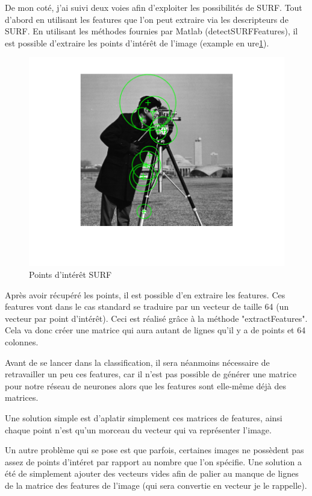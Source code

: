 De mon coté, j'ai suivi deux voies afin d'exploiter les possibilités de SURF. Tout d'abord en utilisant les features que l'on peut extraire via les descripteurs de SURF. En utilisant les méthodes fournies par Matlab (detectSURFFeatures), il est possible d'extraire les points d'intérêt de l'image (example en ure\ref{fig:surffeaturesexample}).

\begin{figure}[h]
\centering
\includegraphics{pictures/DetectSURFFeaturesExample_01.png}
\caption{Points d'intérêt SURF}
\label{fig:surffeaturesexample}
\end{figure}

Après avoir récupéré les points, il est possible d'en extraire les features. Ces features vont dans le cas standard se traduire par un vecteur de taille 64 (un vecteur par point d'intérêt). Ceci est réalisé grâce à la méthode "extractFeatures". Cela va donc créer une matrice qui aura autant de lignes qu'il y a de points et 64 colonnes.

Avant de se lancer dans la classification, il sera néanmoins nécessaire de retravailler un peu ces features, car il n'est pas possible de générer une matrice pour notre réseau de neurones alors que les features sont elle-même déjà des matrices.

Une solution simple est d'aplatir simplement ces matrices de features, ainsi chaque point n'est qu'un morceau du vecteur qui va représenter l'image.

Un autre problème qui se pose est que parfois, certaines images ne possèdent pas assez de points d'intéret par rapport au nombre que l'on spécifie. Une solution a été de simplement ajouter des vecteurs vides afin de palier au manque de lignes de la matrice des features de l'image (qui sera convertie en vecteur je le rappelle).


